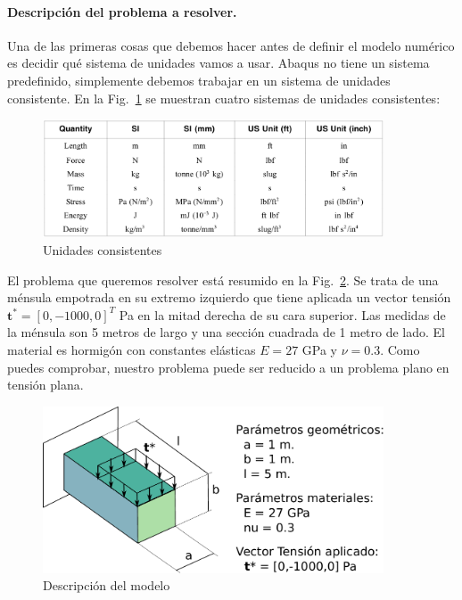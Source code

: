 \paragraph{Descripción del problema a resolver.} Una de las primeras
cosas que debemos hacer antes de definir el modelo numérico es decidir
qué sistema de unidades vamos a usar. Abaqus no tiene un sistema
predefinido, simplemente debemos trabajar en un sistema de unidades
consistente. En la Fig.~\ref{figu01} se muestran cuatro sistemas de
unidades consistentes:
\begin{figure}[H]
  \begin{center}
    \includegraphics[width=0.9\textwidth]{./body/images/imagen01}
  \end{center}
  \caption{Unidades consistentes}
  \label{figu01}
\end{figure}

El problema que queremos resolver está resumido en la
Fig.~\ref{figu114}. Se trata de una ménsula empotrada en su extremo
izquierdo que tiene aplicada un vector tensión
$\mathbf{t}^*=[0,-1000,0]^T$ Pa en la mitad derecha de su cara
superior. Las medidas de la ménsula son 5 metros de largo y una
sección cuadrada de 1 metro de lado. El material es hormigón con
constantes elásticas $E=27$ GPa y $\nu=0.3$. Como puedes comprobar,
nuestro problema puede ser reducido a un problema plano en tensión
plana.
\begin{figure}[H]
  \begin{center}
    \includegraphics[width=0.9\textwidth]{./body/images/imagen114}
  \end{center}
  \caption{Descripción del modelo}
  \label{figu114}
\end{figure}



